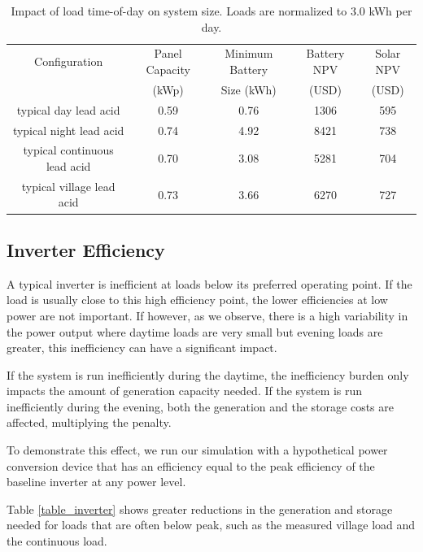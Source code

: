 \documentclass[conference]{IEEEtran}
\begin{document}
\begin{table}
\centering
\begin{tabular}{c c c c c}
Configuration & Panel Capacity & Minimum Battery & Battery NPV & Solar NPV \\
              & (kWp)          & Size (kWh)      & (USD)       & (USD)     \\
\hline
typical day lead acid          & 0.59 & 0.76 & 1306 & 595 \\
typical night lead acid        & 0.74 & 4.92 & 8421 & 738 \\
typical continuous lead acid   & 0.70 & 3.08 & 5281 & 704 \\
typical village lead acid      & 0.73 & 3.66 & 6270 & 727 \\
\end{tabular}
\caption{Impact of load time-of-day on system size.
Loads are normalized to 3.0 kWh per day.}
\label{tbl_baseline}
\end{table}

\subsection{Inverter Efficiency}

A typical inverter is inefficient at loads below its
preferred operating point.
If the load is usually close to this high efficiency
point, the lower efficiencies at low power are not important.
If however, as we observe, there is a high variability
in the power output where daytime loads are very small
but evening loads are greater, this inefficiency can have
a significant impact.

If the system is run inefficiently during the daytime, the inefficiency
burden only impacts the amount of generation capacity needed.
If the system is run inefficiently during the evening, both the
generation and the storage costs are affected, multiplying the
penalty.

To demonstrate this effect, we run our simulation with
a hypothetical power conversion device that has an
efficiency equal to the peak efficiency of the baseline
inverter at any power level.

Table \ref{table_inverter} shows greater reductions
in the generation and storage needed for loads that
are often below peak, such as the measured village load
and the continuous load.
\end{document}
